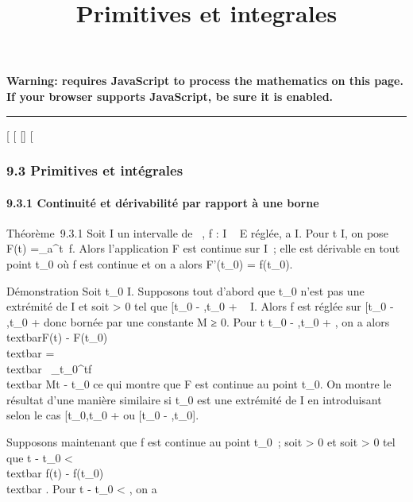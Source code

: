 \documentclass[]{article}
\title{Primitives et integrales}
\author{}
\date{}
\begin{document}
\maketitle

\textbf{Warning: 
requires JavaScript to process the mathematics on this page.\\ If your
browser supports JavaScript, be sure it is enabled.}

\begin{center}\rule{3in}{0.4pt}\end{center}

{[}
{[}
{[}{]}
{[}

\subsubsection{9.3 Primitives et intégrales}

\paragraph{9.3.1 Continuité et dérivabilité par rapport à une borne}

Théorème~9.3.1 Soit I un intervalle de ~, f : I \rightarrow~ E réglée, a \in I. Pour
t \in I, on pose F(t) =\int  \_a^t~f.
Alors l'application F est continue sur I~; elle est dérivable en tout
point t\_0 où f est continue et on a alors F'(t\_0) =
f(t\_0).

Démonstration Soit t\_0 \in I. Supposons tout d'abord que
t\_0 n'est pas une extrémité de I et soit \eta \textgreater{} 0 tel
que {[}t\_0 - \eta,t\_0 + \eta{]} \subset~ I. Alors f est réglée sur
{[}t\_0 - \eta,t\_0 + \eta{]} donc bornée par une constante M
≥ 0. Pour t \in {[}t\_0 - \eta,t\_0 + \eta{]}, on a alors
\\textbar{}F(t) -
F(t\_0)\\textbar{}
=\\textbar{}\int ~
\_t\_0^tf\\textbar{} \leq M\textbar{}t
- t\_0\textbar{} ce qui montre que F est continue au point
t\_0. On montre le résultat d'une manière similaire si
t\_0 est une extrémité de I en introduisant selon le cas
{[}t\_0,t\_0 + \eta{]} ou {[}t\_0 -
\eta,t\_0{]}.

Supposons maintenant que f est continue au point t\_0~; soit \epsilon
\textgreater{} 0 et soit \eta \textgreater{} 0 tel que \textbar{}t -
t\_0\textbar{} \textless{} \eta \rigtharrow~\\textbar{} f(t) -
f(t\_0)\\textbar{} \leq \epsilon. Pour \textbar{}t -
t\_0\textbar{} \textless{} \eta, on a
\end{document}
